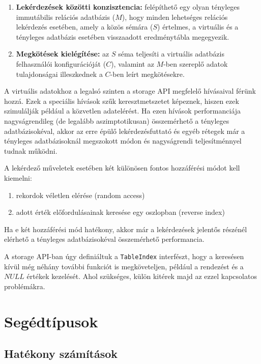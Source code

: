 \documentclass[
    parspace,
    noindent,
    nohyp,
]{elteiktdk}[2023/04/10]
\begin{document}
\begin{enumerate}
  \item \textbf{Lekérdezések közötti konzisztencia:}
        felépíthető egy olyan tényleges immutábilis relációs adatbázis ($M$),
        hogy minden lehetséges relációs lekérdezés esetében, amely a közös sémára ($S$) értelmes,
        a virtuális és a tényleges adatbázis esetében visszaadott eredménytábla megegyezik.
  \item \textbf{Megkötések kielégítése:}
        az $S$ séma teljesíti a virtuális adatbázis felhasználói konfigurációját ($C$),
        valamint az $M$-ben szereplő adatok tulajdonságai illeszkednek a $C$-ben leírt megkötésekre.
\end{enumerate}

A virtuális adatokhoz a legalsó szinten a storage API megfelelő hívásaival férünk hozzá.
Ezek a speciális hívások szűk keresztmetszetet képeznek,
hiszen ezek szimulálják például a közvetlen adatelérést.
Ha ezen hívások performanciája nagyságrendileg (de legalább aszimptotikusan) összemérhető a tényleges adatbázisokéval,
akkor az erre épülő lekérdezésfuttató és egyéb rétegek már
a tényleges adatbázisoknál megszokott módon és nagyságrendi teljesítménnyel tudnak működni.

A lekérdező műveletek esetében két különösen fontos hozzáférési módot kell kiemelni:

\begin{enumerate}
  \item rekordok véletlen elérése (random access)
  \item adott érték előfordulásainak keresése egy oszlopban (reverse index)
\end{enumerate}

Ha e két hozzáférési mód hatékony, akkor már a lekérdezések jelentős részénél
elérhető a tényleges adatbázisokéval összemérhető performancia.

A storage API-ban úgy definiáltuk a \texttt{TableIndex} interfészt,
hogy a keresésen kívül még néhány további funkciót is megköveteljen,
például a rendezést és a $NULL$ értékek kezelését.
Ahol szükséges, külön kitérek majd az ezzel kapcsolatos problémákra.

\section{Segédtípusok}

\subsection{Hatékony számítások}
\end{document}
